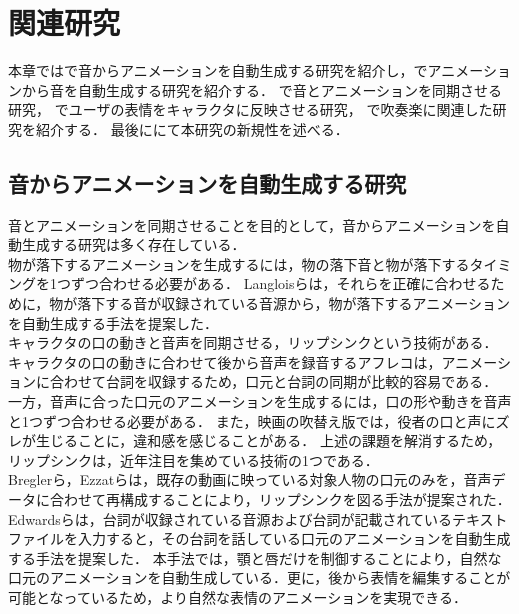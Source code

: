 \chapter{関連研究}
\label{chap:previousworks}
本章ではで音からアニメーションを自動生成する研究を紹介し，でアニメーションから音を自動生成する研究を紹介する．
で音とアニメーションを同期させる研究，
でユーザの表情をキャラクタに反映させる研究，
で吹奏楽に関連した研究を紹介する．
最後ににて本研究の新規性を述べる．

\section{音からアニメーションを自動生成する研究}\label{sec:generate_animation}
音とアニメーションを同期させることを目的として，音からアニメーションを自動生成する研究は多く存在している．\\
\indent
物が落下するアニメーションを生成するには，物の落下音と物が落下するタイミングを1つずつ合わせる必要がある．
Langloisら\cite{IFA}は，それらを正確に合わせるために，物が落下する音が収録されている音源から，物が落下するアニメーションを自動生成する手法を提案した．\\
%
\indent
キャラクタの口の動きと音声を同期させる，リップシンクという技術がある．
キャラクタの口の動きに合わせて後から音声を録音するアフレコは，アニメーションに合わせて台詞を収録するため，口元と台詞の同期が比較的容易である．
一方，音声に合った口元のアニメーションを生成するには，口の形や動きを音声と1つずつ合わせる必要がある．
また，映画の吹替え版では，役者の口と声にズレが生じることに，違和感を感じることがある．
上述の課題を解消するため，リップシンクは，近年注目を集めている技術の1つである．\\
\indent
Breglerら\cite{Bregler}，Ezzatら\cite{Ezzat}は，既存の動画に映っている対象人物の口元のみを，音声データに合わせて再構成することにより，リップシンクを図る手法が提案された．
Edwardsら\cite{JALI}は，台詞が収録されている音源および台詞が記載されているテキストファイルを入力すると，その台詞を話している口元のアニメーションを自動生成する手法を提案した．
本手法では，顎と唇だけを制御することにより，自然な口元のアニメーションを自動生成している．更に，後から表情を編集することが可能となっているため，より自然な表情のアニメーションを実現できる．\\
